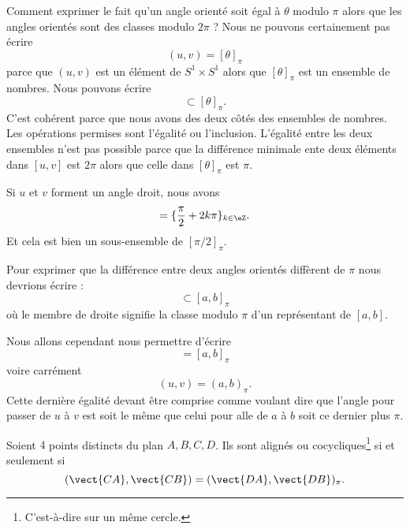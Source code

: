 \begin{normaltext}
    Comment exprimer le fait qu'un angle orienté soit égal à \( \theta\) modulo \( \pi\) alors que les angles orientés sont des classes modulo \( 2\pi\) ? Nous ne pouvons certainement pas écrire
    \begin{equation}
        (u,v)=[\theta]_{\pi}
    \end{equation}
    parce que \( (u,v)\) est un élément de \( S^1\times S^1\) alors que \( [\theta]_{\pi}\) est un ensemble de nombres. Nous pouvons écrire
    \begin{equation}
        [u,v]\subset [\theta]_{\pi}.
    \end{equation}
    C'est cohérent parce que nous avons des deux côtés des ensembles de nombres. Les opérations permises sont l'égalité ou l'inclusion. L'égalité entre les deux ensembles n'est pas possible parce que la différence minimale ente deux éléments dans \( [u,v]\) est \( 2\pi\) alors que celle dans \( [\theta]_{\pi}\) est \( \pi\).

    Si \( u\) et \( v\) forment un angle droit, nous avons
    \begin{equation}
        [u,v]=\{ \frac{ \pi }{2}+2k\pi \}_{k\in \eZ}.
    \end{equation}
    Et cela est bien un sous-ensemble de \( [\pi/2]_{\pi}\).

    Pour exprimer que la différence entre deux angles orientés diffèrent de \( \pi\) nous devrions écrire :
    \begin{equation}
        [u,v]\subset[a,b]_{\pi}
    \end{equation}
    où le membre de droite signifie la classe modulo \( \pi\) d'un représentant de \( [a,b]\).

    Nous allons cependant nous permettre d'écrire
    \begin{equation}
        [u,v]=[a,b]_{\pi}
    \end{equation}
    voire carrément
    \begin{equation}
        (u,v)=(a,b)_{\pi}.
    \end{equation}
    Cette dernière égalité devant être comprise comme voulant dire que l'angle pour passer de \( u\) à \( v\) est soit le même que celui pour alle de \( a\) à \( b\) soit ce dernier plus \( \pi\).
\end{normaltext}

\begin{theorem}      \label{THOooUDUGooTJKDpO}
    Soient \( 4\) points distincts du plan \( A,B,C,D\). Ils sont alignés ou cocycliques\footnote{C'est-à-dire sur un même cercle.} si et seulement si
    \begin{equation}
        (\vect{ CA },\vect{ CB })=(\vect{ DA },\vect{ DB })_{\pi}.
    \end{equation}
\end{theorem}


